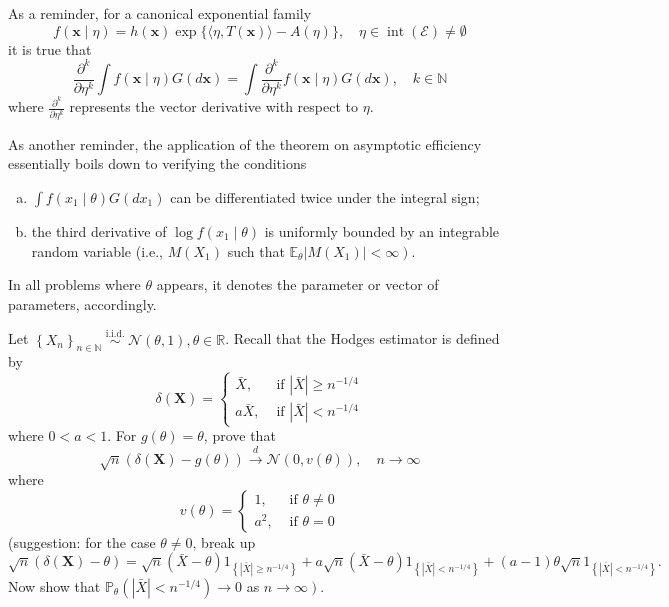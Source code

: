 \chapter{}

 As a reminder, for a canonical exponential family
\[
f(\mathbf{x} \mid \eta)=h(\mathbf{x}) \exp \{\langle\eta, T(\mathbf{x})\rangle-A(\eta)\}, \quad \eta \in \operatorname{int}(\mathcal{E}) \neq \emptyset
\]
it is true that
\[
\frac{\partial^{k}}{\partial \eta^{k}} \int f(\mathbf{x} \mid \eta) G(d \mathbf{x})=\int \frac{\partial^{k}}{\partial \eta^{k}} f(\mathbf{x} \mid \eta) G(d \mathbf{x}), \quad k \in \mathbb{N}
\]
where \(\frac{\partial^{k}}{\partial \eta^{k}}\) represents the vector derivative with respect to \(\eta\).

 As another reminder, the application of the theorem on asymptotic efficiency essentially boils down to verifying the conditions
\begin{enumerate}[(a)]
    \item \(\int f\left(x_{1} \mid \theta\right) G\left(d x_{1}\right)\) can be differentiated twice under the integral sign; 
    \item the third derivative of \(\log f\left(x_{1} \mid \theta\right)\) is uniformly bounded by an integrable random variable (i.e., \(M\left(X_{1}\right)\) such that \(\left.\mathbb{E}_{\theta}\left|M\left(X_{1}\right)\right|<\infty\right)\). 
\end{enumerate}
In all problems where \(\theta\) appears, it denotes the parameter or vector of parameters, accordingly. 

\begin{ex}
    Let \(\left\{X_{n}\right\}_{n \in \mathbb{N}} \stackrel{\text { i.i.d. }}{\sim} \mathcal{N}(\theta, 1), \theta \in \mathbb{R}\). Recall that the Hodges estimator is defined by
\[
\delta(\mathbf{X})=\left\{\begin{array}{cl}
\bar{X}, & \text { if }|\bar{X}| \geq n^{-1 / 4} \\
a \bar{X}, & \text { if }|\bar{X}|<n^{-1 / 4}
\end{array}\right.
\]
where \(0<a<1\). For \(g(\theta)=\theta\), prove that
\[
\sqrt{n}(\delta(\mathbf{X})-g(\theta)) \stackrel{d}{\rightarrow} \mathcal{N}(0, v(\theta)), \quad n \rightarrow \infty
\]
where
\[
v(\theta)=\left\{\begin{array}{cc}
1, & \text { if } \theta \neq 0 \\
a^{2}, & \text { if } \theta=0
\end{array}\right.
\]
(suggestion: for the case \(\theta \neq 0\), break up
\[
\sqrt{n}(\delta(\mathbf{X})-\theta)=\sqrt{n}(\bar{X}-\theta) 1_{\left\{|\bar{X}| \geq n^{-1 / 4}\right\}}+a \sqrt{n}(\bar{X}-\theta) 1_{\left\{|\bar{X}|<n^{-1 / 4}\right\}}+(a-1) \theta \sqrt{n} 1_{\left\{|\bar{X}|<n^{-1 / 4}\right\}} .
\]
Now show that \(\mathbb{P}_{\theta}\left(|\bar{X}|<n^{-1 / 4}\right) \rightarrow 0\) as \(\left.n \rightarrow \infty\right)\).
\end{ex}

